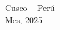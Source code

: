 \begin{titlepage}
\begin{center}
	
	\vspace{0.2cm}

    \Large{Cusco -- Per\'u \\
    Mes, 2025}
    
  \end{center}
\end{titlepage}
